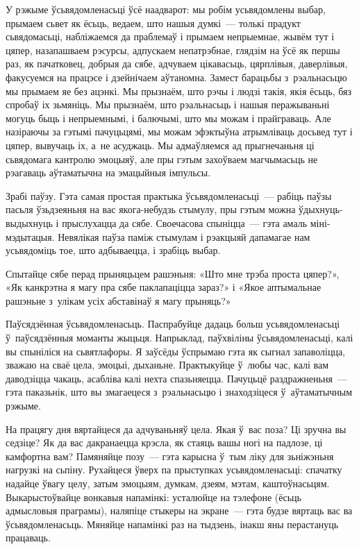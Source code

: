 У рэжыме ўсьвядомленасьці ўсё наадварот: мы робім усьвядомлены выбар, прымаем сьвет як ёсьць, ведаем, што нашыя думкі~--- толькі прадукт сьвядомасьці, набліжаемся да праблемаў і прымаем непрыемнае, жывём тут і цяпер, назапашваем рэсурсы, адпускаем непатрэбнае, глядзім на ўсё як першы раз, як пачатковец, добрыя да сябе, адчуваем цікавасьць, цярплівыя, даверлівыя, факусуемся на працэсе і дзейнічаем аўтаномна. Замест барацьбы з~рэальнасьцю мы прымаем яе без ацэнкі. Мы прызнаём, што рэчы і людзі такія, якія ёсьць, бяз спробаў іх зьмяніць. Мы прызнаём, што рэальнасьць і нашыя перажываньні могуць быць і непрыемнымі, і балючымі, што мы можам і прайграваць. Але назіраючы за гэтымі пачуцьцямі, мы можам эфэктыўна атрымліваць досьвед тут і цяпер, вывучаць іх, а~не асуджаць. Мы адмаўляемся ад прыгнечаньня ці сьвядомага кантролю эмоцыяў, але пры гэтым захоўваем магчымасьць не рэагаваць аўтаматычна на эмацыйныя імпульсы.

Зрабі паўзу. Гэта самая простая практыка ўсьвядомленасьці~--- рабіць паўзы пасьля ўзьдзеяньня на вас якога-небудзь стымулу, пры гэтым можна ўдыхнуць-выдыхнуць і прыслухацца да сябе. Своечасова спыніцца~--- гэта амаль міні-мэдытацыя. Невялікая паўза паміж стымулам і рэакцыяй дапамагае нам усьвядоміць тое, што адбываецца, і зрабіць выбар.

Спытайце сябе перад прыняцьцем рашэньня: «Што мне трэба проста цяпер?», «Як канкрэтна я магу пра сябе паклапаціцца зараз?» і «Якое аптымальнае рашэньне з~улікам усіх абставінаў я магу прыняць?»

Паўсядзённая ўсьвядомленасьць. Паспрабуйце дадаць больш усьвядомленасьці ў~паўсядзённыя моманты жыцьця. Напрыклад, паўхвіліны ўсьвядомленасьці, калі вы спыніліся на сьвятлафоры. Я заўсёды ўспрымаю гэта як сыгнал запаволіцца, зважаю на сваё цела, эмоцыі, дыханьне. Практыкуйце ў~любы час, калі вам даводзіцца чакаць, асабліва калі нехта спазьняецца. Пачуцьцё раздражненьня~--- гэта паказьнік, што вы змагаецеся з~рэальнасьцю і знаходзіцеся ў~аўтаматычным рэжыме.

На працягу дня вяртайцеся да адчуваньняў цела. Якая ў~вас поза? Ці зручна вы седзіце? Як да вас дакранаецца крэсла, як стаяць вашы ногі на падлозе, ці камфортна вам? Памяняйце позу~--- гэта карысна ў~тым ліку для зьніжэньня нагрузкі на сьпіну. Рухайцеся ўверх па прыступках усьвядомленасьці: спачатку надайце ўвагу целу, затым эмоцыям, думкам, дзеям, мэтам, каштоўнасьцям. Выкарыстоўвайце вонкавыя напамінкі: усталюйце на тэлефоне (ёсьць адмысловыя праграмы), наляпіце стыкеры на экране~--- гэта будзе вяртаць вас ва ўсьвядомленасьць. Мяняйце напамінкі раз на тыдзень, інакш яны перастануць працаваць.


